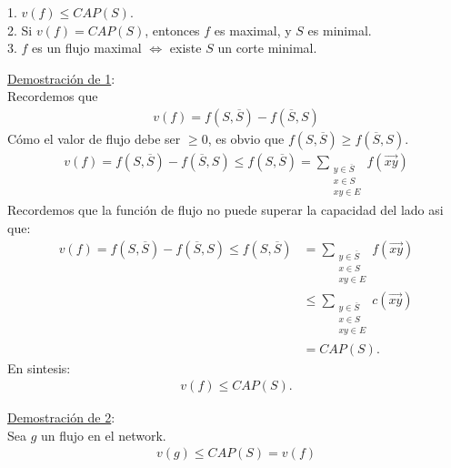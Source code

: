 \documentclass{article}
\begin{document}
1. $v(f) \leq CAP(S).$\\

2. Si $v(f) = CAP(S)$, entonces $f$ es maximal, y $S$ es minimal.\\

3. $f$ es un flujo maximal $\iff$ existe $S$ un corte minimal.

\underline{Demostración de 1}:\\

Recordemos que
\begin{equation}
	\begin{aligned}
		v(f) = f(S,\overline{S}) - f(\overline{S},S)
	\end{aligned}
\end{equation}
Cómo el valor de flujo debe ser $\geq 0$, es obvio que $f(S,\overline{S}) \geq f(\overline{S},S)$.
\begin{equation}
	\begin{aligned}
		v(f) = f(S,\overline{S}) - f(\overline{S},S) \leq f(S,\overline{S}) =
		\sum_{
			\substack{y \in \overline{S}\\
			x \in S\\
			xy \in E
		}
		} f(\overrightarrow{xy})
	\end{aligned}
\end{equation}
Recordemos que la función de flujo no puede superar la capacidad del lado asi que:
\begin{equation}
	\begin{aligned}
		v(f) = f(S,\overline{S}) - f(\overline{S},S) \leq f(S,\overline{S}) &=
		\sum_{
			\substack{y \in \overline{S}\\
			x \in S\\
			xy \in E
				}
		} f(\overrightarrow{xy}) \\
		&\leq 	\sum_{
			\substack{y \in \overline{S}\\
			x \in S\\
			xy \in E
		}
		} c(\overrightarrow{xy}) \\
		&= CAP(S).
	\end{aligned}
\end{equation}
En sintesis:
\begin{equation}
	\begin{aligned}
	v(f) \leq CAP(S).
	\end{aligned}
\end{equation}


\underline{Demostración de 2}:\\

Sea $g$ un flujo en el network.
\begin{equation}
	\begin{aligned}
		v(g) \leq CAP(S) = v(f)
	\end{aligned}
\end{equation}
\end{document}
